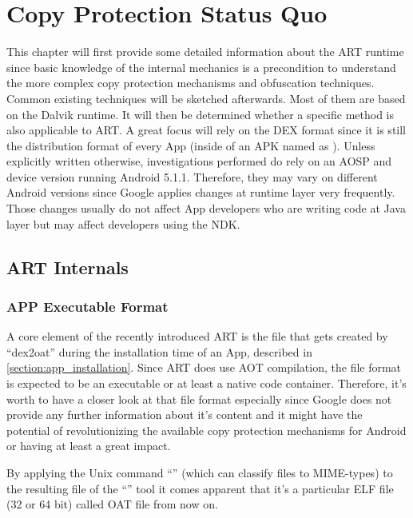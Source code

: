 \chapter{Copy Protection Status Quo}
\label{chapter:copy_protection_status_quo}

This chapter will first provide some detailed information about the ART runtime since basic knowledge of the internal mechanics is a precondition to understand the more complex copy protection mechanisms and obfuscation techniques. Common existing techniques will be sketched afterwards. Most of them are based on the Dalvik runtime. It will then be determined whether a specific method is also
applicable to ART. A great focus will rely on the DEX format since
it is still the distribution format of every App (inside of an APK named as
). Unless explicitly written otherwise, investigations performed do rely on an AOSP and device version running Android 5.1.1.
Therefore, they may vary on different Android versions since Google applies changes at runtime layer very frequently. Those changes usually do not affect App developers who are writing code at Java layer but may affect developers
using the NDK.

\section{ART Internals}
\label{section:art_internals}

\subsection{APP Executable Format}\label{section:app_executable_format}

A core element of the recently introduced ART is the file that
gets created by ``dex2oat'' during the installation time of an App,
described in \autoref{section:app_installation}.
Since ART does use AOT compilation, the file format is expected
to be an executable or at least a native code container.
Therefore, it's worth to have a closer look at that file format
especially since Google does not provide any further information
about it's content and it might have the potential of
revolutionizing the available copy protection mechanisms for
Android or having at least a great impact.

By applying the Unix command ``'' (which can classify
files to MIME-types) to the resulting file of the ``''
tool it comes apparent that it's a particular ELF file (32 or 64 bit)
called OAT file from now on.

